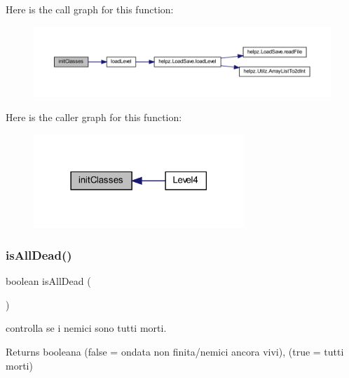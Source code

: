 Here is the call graph for this function\+:
\nopagebreak
\begin{figure}[H]
\begin{center}
\leavevmode
\includegraphics[width=350pt]{classscenes_1_1_level4_afe125d345675ffefe8da7e96d39773f3_cgraph}
\end{center}
\end{figure}
Here is the caller graph for this function\+:\nopagebreak
\begin{figure}[H]
\begin{center}
\leavevmode
\includegraphics[width=225pt]{classscenes_1_1_level4_afe125d345675ffefe8da7e96d39773f3_icgraph}
\end{center}
\end{figure}
\mbox{\label{classscenes_1_1_level4_acd1846d50c3d8678777f9ab6716f5cf3}} 
\subsubsection{\texorpdfstring{is\+All\+Dead()}{isAllDead()}}
{\footnotesize\ttfamily boolean is\+All\+Dead (\begin{DoxyParamCaption}{ }\end{DoxyParamCaption})\hspace{0.3cm}{\ttfamily [private]}}



controlla se i nemici sono tutti morti. 

\begin{DoxyReturn}{Returns}
booleana (false = ondata non finita/nemici ancora vivi), (true = tutti morti) 
\end{DoxyReturn}


